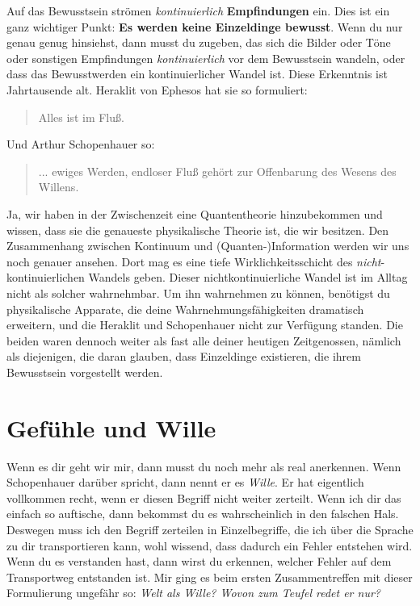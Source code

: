 \documentclass[12pt]{book}
\begin{document}
Auf das Bewusstsein strömen \textit{kontinuierlich} \textbf{Empfindungen} ein. Dies ist ein ganz wichtiger Punkt: \textbf{Es werden keine Einzeldinge bewusst}. Wenn du nur genau genug hinsiehst, dann musst du zugeben, das sich die Bilder oder Töne oder sonstigen Empfindungen \textit{kontinuierlich} vor dem Bewusstsein wandeln, oder dass das Bewusstwerden ein kontinuierlicher Wandel ist. Diese Erkenntnis ist Jahrtausende alt. Heraklit von Ephesos hat sie so formuliert:

\begin{quote}\begin{tcolorbox}
Alles ist im Fluß.
\end{tcolorbox}\end{quote}

Und Arthur Schopenhauer so:

\begin{quote}\begin{tcolorbox}
... ewiges Werden, endloser Fluß gehört zur Offenbarung des Wesens des Willens.
\end{tcolorbox}\end{quote}

Ja, wir haben in der Zwischenzeit eine Quantentheorie hinzubekommen und wissen, dass sie die genaueste physikalische Theorie ist, die wir besitzen. Den Zusammenhang zwischen Kontinuum und (Quanten-)Information werden wir uns noch genauer ansehen. Dort mag es eine tiefe Wirklichkeitsschicht des \textit{nicht}-kontinuierlichen Wandels geben. Dieser nichtkontinuierliche Wandel ist im Alltag nicht als solcher wahrnehmbar. Um ihn wahrnehmen zu können, benötigst du physikalische Apparate, die deine Wahrnehmungsfähigkeiten dramatisch erweitern, und die Heraklit und Schopenhauer nicht zur Verfügung standen. Die beiden waren dennoch weiter als fast alle deiner heutigen Zeitgenossen, nämlich als diejenigen, die daran glauben, dass Einzeldinge existieren, die ihrem Bewusstsein vorgestellt werden.

\section{Gefühle und Wille}

Wenn es dir geht wir mir, dann musst du noch mehr als real anerkennen. Wenn Schopenhauer darüber spricht, dann nennt er es \textit{Wille}. Er hat eigentlich vollkommen recht, wenn er diesen Begriff nicht weiter zerteilt. Wenn ich dir das einfach so auftische, dann bekommst du es wahrscheinlich in den falschen Hals. Deswegen muss ich den Begriff zerteilen in Einzelbegriffe, die ich über die Sprache zu dir transportieren kann, wohl wissend, dass dadurch ein Fehler entstehen wird. Wenn du es verstanden hast, dann wirst du erkennen, welcher Fehler auf dem Transportweg entstanden ist. Mir ging es beim ersten Zusammentreffen mit dieser Formulierung ungefähr so: \textit{Welt als Wille? Wovon zum Teufel redet er nur?}
\end{document}
